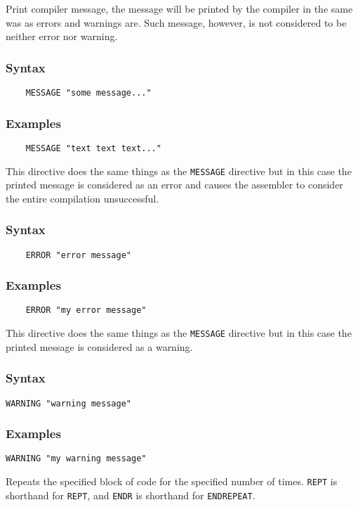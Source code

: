     Print compiler message, the message will be printed by the compiler in the same was as errors and warnings are. Such message, however, is not considered to be neither error nor warning.

    \subsubsection{Syntax}
        \verb'    MESSAGE "some message..."'

    \subsubsection{Examples}
        \verb'    MESSAGE "text text text..."'

    This directive does the same things as the \texttt{MESSAGE} directive but in this case the printed message is considered as an error and causes the assembler to consider the entire compilation unsuccessful.

    \subsubsection{Syntax}
        \verb'    ERROR "error message"'

    \subsubsection{Examples}
        \verb'    ERROR "my error message"'

    This directive does the same things as the \texttt{MESSAGE} directive but in this case the printed message is considered as a warning.

    \subsubsection{Syntax}
        \verb'WARNING "warning message"'

    \subsubsection{Examples}
        \verb'WARNING "my warning message"'

\clearpage
{}
    Repeats the specified block of code for the specified number of times. \texttt{REPT} is shorthand for \texttt{REPT}, and \texttt{ENDR} is shorthand for \texttt{ENDREPEAT}.


